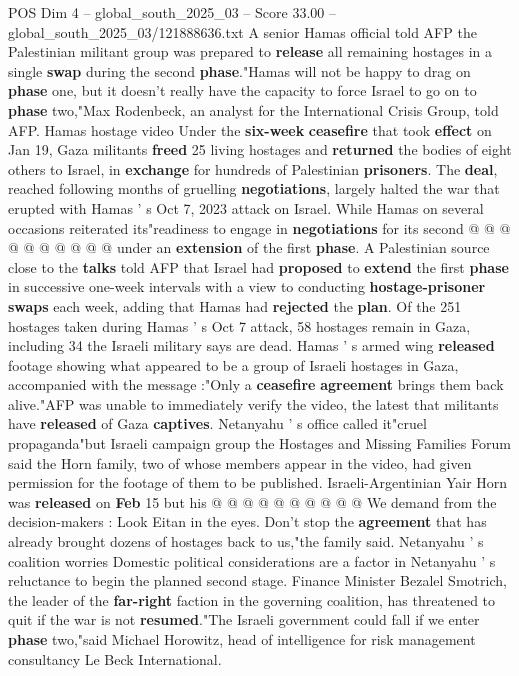 \begin{textsample}{POS Dim 4 – global\_south\_2025\_03 – Score 33.00 – global\_south\_2025\_03/121888636.txt}
A senior Hamas official told AFP the Palestinian militant group was prepared to \textbf{release} all remaining hostages in a single \textbf{swap} during the second \textbf{phase}."Hamas will not be happy to drag on \textbf{phase} one, but it doesn't really have the capacity to force Israel to go on to \textbf{phase} two,"Max Rodenbeck, an analyst for the International Crisis Group, told AFP.
Hamas hostage video Under the \textbf{six-week} \textbf{ceasefire} that took \textbf{effect} on Jan 19, Gaza militants \textbf{freed} 25 living hostages and \textbf{returned} the bodies of eight others to Israel, in \textbf{exchange} for hundreds of Palestinian \textbf{prisoners}.
The \textbf{deal}, reached following months of gruelling \textbf{negotiations}, largely halted the war that erupted with Hamas ' s Oct 7, 2023 attack on Israel.
While Hamas on several occasions reiterated its"readiness to engage in \textbf{negotiations} for its second @ @ @ @ @ @ @ @ @ @ under an \textbf{extension} of the first \textbf{phase}.
A Palestinian source close to the \textbf{talks} told AFP that Israel had \textbf{proposed} to \textbf{extend} the first \textbf{phase} in successive one-week intervals with a view to conducting \textbf{hostage-prisoner} \textbf{swaps} each week, adding that Hamas had \textbf{rejected} the \textbf{plan}.
Of the 251 hostages taken during Hamas ' s Oct 7 attack, 58 hostages remain in Gaza, including 34 the Israeli military says are dead.
Hamas ' s armed wing \textbf{released} footage showing what appeared to be a group of Israeli hostages in Gaza, accompanied with the message :"Only a \textbf{ceasefire} \textbf{agreement} brings them back alive."AFP was unable to immediately verify the video, the latest that militants have \textbf{released} of Gaza \textbf{captives}.
Netanyahu ' s office called it"cruel propaganda"but Israeli campaign group the Hostages and Missing Families Forum said the Horn family, two of whose members appear in the video, had given permission for the footage of them to be published.
Israeli-Argentinian Yair Horn was \textbf{released} on \textbf{Feb} 15 but his @ @ @ @ @ @ @ @ @ @ We demand from the decision-makers : Look Eitan in the eyes.
Don't stop the \textbf{agreement} that has already brought dozens of hostages back to us,"the family said.
Netanyahu ' s coalition worries Domestic political considerations are a factor in Netanyahu ' s reluctance to begin the planned second stage.
Finance Minister Bezalel Smotrich, the leader of the \textbf{far-right} faction in the governing coalition, has threatened to quit if the war is not \textbf{resumed}."The Israeli government could fall if we enter \textbf{phase} two,"said Michael Horowitz, head of intelligence for risk management consultancy Le Beck International.

\end{textsample}
